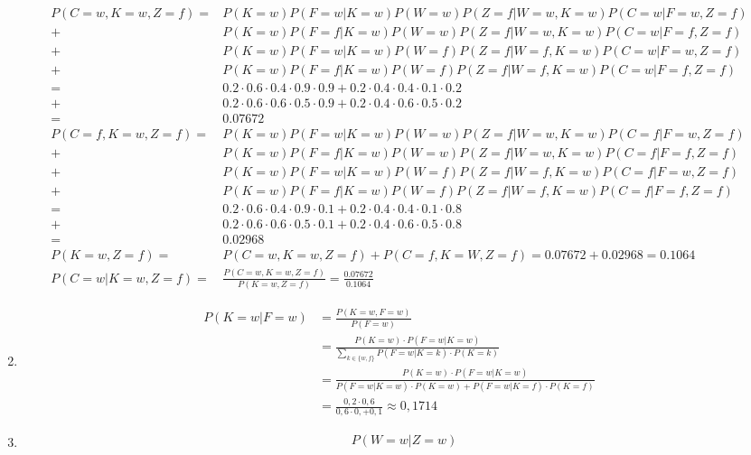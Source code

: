 \documentclass[a4paper,10pt]{article}
\begin{document}
\begin{enumerate}[~~a.)]
\begin{align*}
            P(C=w,K=w,Z=f)=&P(K=w)P(F=w|K=w)P(W=w)P(Z=f|W=w,K=w)P(C=w|F=w,Z=f)\\
            +&P(K=w)P(F=f|K=w)P(W=w)P(Z=f|W=w,K=w)P(C=w|F=f,Z=f)\\
            +&P(K=w)P(F=w|K=w)P(W=f)P(Z=f|W=f,K=w)P(C=w|F=w,Z=f)\\
            +&P(K=w)P(F=f|K=w)P(W=f)P(Z=f|W=f,K=w)P(C=w|F=f,Z=f)\\
            =&0.2\cdot 0.6\cdot 0.4\cdot 0.9\cdot 0.9+0.2\cdot 0.4\cdot 0.4\cdot 0.1\cdot 0.2\\
            +&0.2\cdot 0.6\cdot 0.6\cdot 0.5\cdot 0.9+0.2\cdot 0.4\cdot 0.6\cdot 0.5\cdot 0.2\\
            =& 0.07672\\
            P(C=f,K=w,Z=f)=&P(K=w)P(F=w|K=w)P(W=w)P(Z=f|W=w,K=w)P(C=f|F=w,Z=f)\\
            +&P(K=w)P(F=f|K=w)P(W=w)P(Z=f|W=w,K=w)P(C=f|F=f,Z=f)\\
            +&P(K=w)P(F=w|K=w)P(W=f)P(Z=f|W=f,K=w)P(C=f|F=w,Z=f)\\
            +&P(K=w)P(F=f|K=w)P(W=f)P(Z=f|W=f,K=w)P(C=f|F=f,Z=f)\\
            =&0.2\cdot 0.6\cdot 0.4\cdot 0.9\cdot 0.1+0.2\cdot 0.4\cdot 0.4\cdot 0.1\cdot 0.8\\
            +&0.2\cdot 0.6\cdot 0.6\cdot 0.5\cdot 0.1+0.2\cdot 0.4\cdot 0.6\cdot 0.5\cdot 0.8\\
            =& 0.02968\\
            P(K=w,Z=f)=&P(C=w,K=w,Z=f)+P(C=f,K=W,Z=f)=0.07672+0.02968=0.1064\\
            P(C=w|K=w,Z=f)=&\frac{P(C=w,K=w,Z=f)}{P(K=w,Z=f)} =\frac{0.07672}{0.1064}
            \end{align*}
        \item
            \begin{align*}
            P(K=w|F=w)&=\frac{P(K=w,F=w)}{P(F=w)}\\
            &=\frac{P(K=w)\cdot P(F=w|K=w)}{\sum\limits_{k\in \{w,f\}}^{} P(F=w|K=k) \cdot P(K=k)}\\
            &=\frac{P(K=w)\cdot P(F=w|K=w)}{P(F=w|K=w)\cdot P(K=w)+P(F=w|K=f)\cdot P(K=f)}\\
            &=\frac{0,2 \cdot 0,6}{0,6\cdot 0,+0,1} \approx 0,1714
            \end{align*}
        \item
        \begin{align*}
        	&P(W = w | Z = w) \\

\end{align*}
\end{enumerate}
\end{document}

